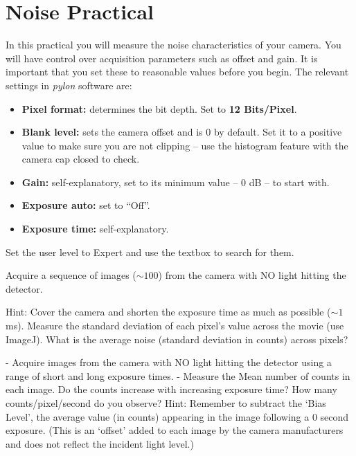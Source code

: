 \documentclass[a4paper]{report}
\newcommand{\nexercise}[0]{\arabic{exercises}\addtocounter{exercises}{1}}
\begin{document}
\section{Noise Practical}
In this practical you will measure the noise characteristics of your camera. 
You will have control over acquisition parameters such as offset and gain. 
It is important that you set these to reasonable values before you begin. 
The relevant settings in \textit{pylon} software are:
\begin{itemize}
	\item \textbf{Pixel format:} determines the bit depth. Set to \textbf{12 Bits/Pixel}.
	\item \textbf{Blank level:} sets the camera offset and is 0 by default. Set it to a positive value to make sure you are not clipping -- use the histogram feature with the camera cap closed to check.
	\item \textbf{Gain:} self-explanatory, set to its minimum value -- 0 dB -- to start with.
	\item \textbf{Exposure auto:} set to ``Off''.
	\item \textbf{Exposure time:} self-explanatory.
\end{itemize}
Set the user level to Expert and use the textbox to search for them. 
\begin{exercisebox}[frametitle={Exercise \nexercise: Measure read-out noise}]
Acquire a sequence of images ($\sim100$) from the camera with NO light hitting the detector. 

Hint: Cover the camera and shorten the exposure time as much as possible ($\sim1$ ms). Measure the standard deviation of each pixel’s value across the movie (use ImageJ). 
What is the average noise (standard deviation in counts) across pixels? 
\end{exercisebox}

\begin{exercisebox}[frametitle={Exercise \nexercise: Measure dark counts}]
- Acquire images from the camera with NO light hitting the detector using a range of short and long exposure times.
- Measure the Mean number of counts in each image. Do the counts increase with increasing exposure time? How many counts/pixel/second do you observe? 
Hint: Remember to subtract the ‘Bias Level’, the average value (in counts) appearing in the image following a 0 second exposure. (This is an ‘offset’ added to each image by the camera manufacturers and does not reflect the incident light level.) 
\end{exercisebox}
\end{document}
